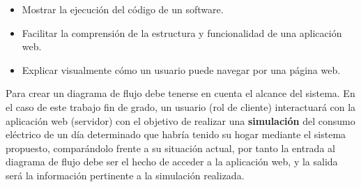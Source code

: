 \begin{itemize}
\item Mostrar la ejecución del código de un software.
\item Facilitar la comprensión de la estructura y funcionalidad de una aplicación web.
\item Explicar visualmente cómo un usuario puede navegar por una página web.
\end{itemize}
Para crear un diagrama de flujo debe tenerse en cuenta el alcance del sistema. En el caso de este trabajo fin de grado, un usuario (rol de cliente) interactuará con la aplicación web (servidor) con el objetivo de realizar una \textbf{simulación} del consumo eléctrico de un día determinado que habría tenido su hogar mediante el sistema propuesto, comparándolo frente a su situación actual, por tanto la entrada al diagrama de flujo debe ser el hecho de acceder a la aplicación web, y la salida será la información pertinente a la simulación realizada.\\

